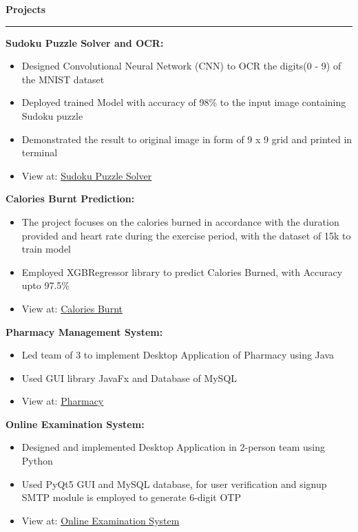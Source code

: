 \documentclass[11pt]{article}
\begin{document}
    \textbf{\large{Projects}}
    \vspace{3pt}
    \hrule
    \vspace{6pt}
    \hspace{8pt}\textbf{Sudoku Puzzle Solver and OCR:}
       \begin{itemize}
        \setlength\itemsep{0pt}
        \setlength\parskip{0pt}
        \setlength\parsep{0pt}
        \item  Designed Convolutional Neural Network (CNN) to OCR the digits(0 - 9) of the MNIST dataset
        \item Deployed trained Model with accuracy of 98\% to the input image containing Sudoku puzzle
        \item Demonstrated the result to original image in form of 9 x 9 grid and printed in terminal
        \item View at: \href{https://github.com/Abhay811/Sudoku_solver}{Sudoku Puzzle Solver}
        \end{itemize}
    \hspace{8pt}\textbf{Calories Burnt Prediction:}
        \begin{itemize}
        \setlength{\itemsep}{0pt}
        \setlength{\parskip}{0pt}
        \setlength{\parsep}{0pt}
        \item The project focuses on the calories burned in accordance with the duration provided and heart rate during the exercise period, with the dataset of 15k to train model 
        \item Employed XGBRegressor library to predict Calories Burned, with Accuracy upto 97.5\%
        \item View at: \href{https://github.com/Abhay811/Calories-Burnt-Prediction}{Calories Burnt}
        \end{itemize}
    \hspace{8pt}\textbf{Pharmacy Management System:}
    \begin{itemize}
        \setlength{\itemsep}{0pt}
        \setlength{\parskip}{0pt}
        \setlength{\parsep}{0pt}
        \item Led team of 3 to implement Desktop Application of Pharmacy using Java
        \item Used GUI library JavaFx and Database of MySQL
        \item View at: \href{https://github.com/Abhay811/DBMS}{Pharmacy}
        \end{itemize}
    \hspace{8pt}\textbf{Online Examination System:}
    \begin{itemize}
        \setlength{\itemsep}{0pt}
        \setlength{\parskip}{0pt}
        \setlength{\parsep}{0pt}
        \item Designed and implemented Desktop Application in 2-person team using Python
        \item Used PyQt5 GUI and MySQL database, for user verification and signup SMTP module is employed to generate 6-digit OTP
        \item View at: \href{https://github.com/Abhay811/Advanced-Online-Examination}{Online Examination System}
    \end{itemize}
\end{document}
